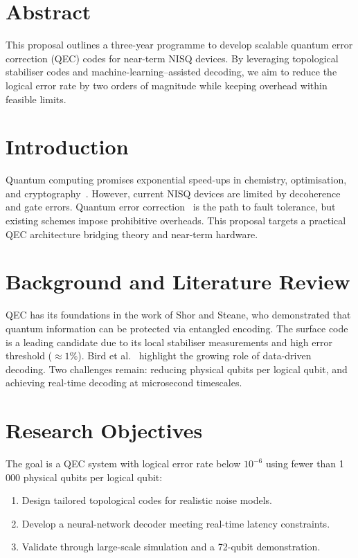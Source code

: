 \documentclass[
    language=english,
    doctype=research-proposal,
    institution=none,
    titlestyle=book,
]{../../omnilatex}
\begin{document}
\maketitle

\frontmatter
\chapter{Abstract}
This proposal outlines a three-year programme to develop scalable quantum error
correction (QEC) codes for near-term NISQ devices.  By leveraging topological
stabiliser codes and machine-learning--assisted decoding, we aim to reduce the
logical error rate by two orders of magnitude while keeping overhead within
feasible limits.

\tableofcontents

\mainmatter

\chapter{Introduction}
Quantum computing promises exponential speed-ups in chemistry, optimisation,
and cryptography~\cite{einstein1905}.  However, current NISQ devices are limited
by decoherence and gate errors.  Quantum error
correction~\cite{diracPrinciplesQuantumMechanics1981} is the path to fault
tolerance, but existing schemes impose prohibitive overheads.  This proposal
targets a practical QEC architecture bridging theory and near-term hardware.

\chapter{Background and Literature Review}
QEC has its foundations in the work of Shor and Steane, who demonstrated that
quantum information can be protected via entangled encoding.  The surface
code~\cite{knuthFundamentalAlgorithms1973} is a leading candidate due to its
local stabiliser measurements and high error threshold ($\approx 1\%$).
Bird et al.~\cite{birdNaturalLanguageProcessing2009} highlight the growing role
of data-driven decoding.  Two challenges remain: reducing physical qubits per
logical qubit, and achieving real-time decoding at microsecond timescales.

\chapter{Research Objectives}
The goal is a QEC system with logical error rate below $10^{-6}$ using fewer
than 1\,000 physical qubits per logical qubit:
\begin{enumerate}
    \item Design tailored topological codes for realistic noise models.
    \item Develop a neural-network decoder meeting real-time latency constraints.
    \item Validate through large-scale simulation and a 72-qubit demonstration.
\end{enumerate}
\end{document}
